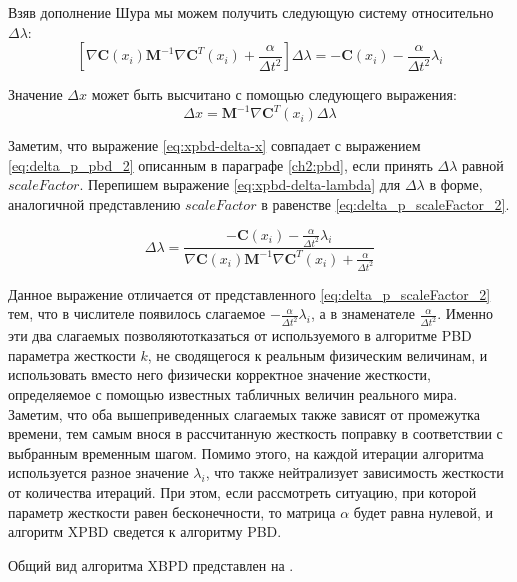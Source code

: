 	Взяв дополнение Шура \cite{prasolov1996} мы можем получить следующую систему относительно $\Delta \lambda$:
\begin{equation} \label{eq:xpbd-delta-lambda}
	\left[\nabla \textbf{C}(x_i) \textbf{M}^{-1} \nabla \textbf{C}^T(x_i) + \frac{\alpha}{\Delta t^2}\right]\Delta \lambda = -\textbf{C}(x_i) - \frac{\alpha}{\Delta t^2}\lambda_i
\end{equation}	

	Значение $\Delta x$ может быть высчитано с помощью следующего выражения:
\begin{equation} \label{eq:xpbd-delta-x}
	 \Delta x = \textbf{M}^{-1} \nabla \textbf{C}^T(x_i) \Delta \lambda
\end{equation}	

	Заметим, что выражение \ref{eq:xpbd-delta-x} совпадает с выражением \ref{eq:delta_p_pbd_2} описанным в параграфе \ref{ch2:pbd}, если принять $\Delta \lambda$ равной $scaleFactor$. Перепишем выражение \ref{eq:xpbd-delta-lambda} для $\Delta \lambda$ в форме, аналогичной представлению $scaleFactor$ в равенстве \ref{eq:delta_p_scaleFactor_2}.
	
\begin{equation} \label{eq:xpbd-delta-lambda-2}
	\Delta \lambda = \frac{-\textbf{C}(x_i) - \frac{\alpha}{\Delta t^2}\lambda_i}{\nabla \textbf{C}(x_i) \textbf{M}^{-1} \nabla \textbf{C}^T(x_i) + \frac{\alpha}{\Delta t^2}}
\end{equation}	

	Данное выражение отличается от представленного  \ref{eq:delta_p_scaleFactor_2} тем, что в числителе появилось слагаемое $- \frac{\alpha}{\Delta t^2}\lambda_i$, а в знаменателе $\frac{\alpha}{\Delta t^2}$. Именно эти два слагаемых позволяютотказаться от используемого в алгоритме PBD параметра жесткости $k$, не сводящегося к реальным физическим величинам, и использовать вместо него физически корректное значение жесткости, определяемое с помощью известных табличных величин реального мира. Заметим, что оба вышеприведенных слагаемых также зависят от промежутка времени, тем самым внося в рассчитанную жесткость поправку в соответствии с выбранным временным шагом. Помимо этого, на каждой итерации алгоритма используется разное значение $\lambda_i$, что также нейтрализует зависимость жесткости от количества итераций. При этом, если рассмотреть ситуацию, при которой параметр жесткости равен бесконечности, то матрица $\alpha$ будет равна нулевой, и алгоритм XPBD сведется к алгоритму PBD. 
	
	Общий вид алгоритма XBPD представлен на .
	
